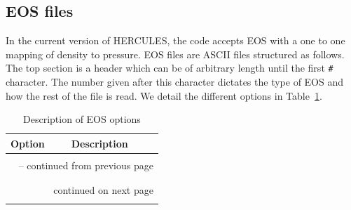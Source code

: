 \documentclass[11pt, oneside]{article}   	%
\begin{document}
\subsection{EOS files}
\label{HUG:sec:EOS_files}

In the current version of HERCULES, the code accepts EOS with a one to one mapping of density to pressure.
EOS files are ASCII files structured as follows.
The top section is a header which can be of arbitrary length until the first \texttt{\#} character.
The number given after this character dictates the type of EOS and how the rest of the file is read.
We detail the different options in Table~\ref{HUG:tab:EOS_files}.

\begin{longtable}{l p{12cm}}
\caption{Description of EOS options}
\label{HUG:tab:EOS_files} \\

Option & Description \\ \hline \hline
\multicolumn{2}{l}{} \\
\endfirsthead

\multicolumn{2}{c}{{\tablename\ \thetable{} -- continued from previous page}} \\
\multicolumn{2}{l}{} \\
\endhead

\multicolumn{2}{l}{} \\
\multicolumn{2}{r}{{continued on next page}} \\
\endfoot

\endlastfoot


\end{longtable}
\end{document}

